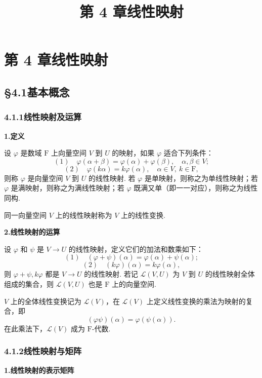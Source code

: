 \documentclass[UTF8, 12pt, fontset=fandol, oneside]{ctexart}
\title{第 4 章\quad 线性映射}
\author{}
\date{}
\begin{document}
\maketitle

\section*{第 4 章\quad 线性映射}

\subsection*{§4.1\quad 基本概念}

\subsubsection*{4.1.1\quad 线性映射及运算}

\noindent\textbf{1.\quad 定义}

设 $\varphi$ 是数域 $\mathrm{F}$ 上向量空间 $V$ 到 $U$ 的映射，如果 $\varphi$ 适合下列条件：
\[
(1)\quad \varphi(\alpha+\beta)=\varphi(\alpha)+\varphi(\beta),\quad \alpha,\beta\in V;
\]
\[
(2)\quad \varphi(k\alpha)=k\varphi(\alpha),\quad \alpha\in V,\ k\in \mathrm{F},
\]
则称 $\varphi$ 是向量空间 $V$ 到 $U$ 的线性映射. 若 $\varphi$ 是单映射，则称之为单线性映射；若 $\varphi$ 是满映射，则称之为满线性映射；若 $\varphi$ 既满又单（即一一对应），则称之为线性同构.

同一向量空间 $V$ 上的线性映射称为 $V$ 上的线性变换.

\noindent\textbf{2.\quad 线性映射的运算}

设 $\varphi$ 和 $\psi$ 是 $V\to U$ 的线性映射，定义它们的加法和数乘如下：
\[
(1)\quad (\varphi+\psi)(\alpha)=\varphi(\alpha)+\psi(\alpha);
\]
\[
(2)\quad (k\varphi)(\alpha)=k\varphi(\alpha),
\]
则 $\varphi+\psi,k\varphi$ 都是 $V\to U$ 的线性映射. 若记 $\mathcal{L}(V,U)$ 为 $V$ 到 $U$ 的线性映射全体组成的集合，则 $\mathcal{L}(V,U)$ 也是 $\mathrm{F}$ 上的向量空间.

$V$ 上的全体线性变换记为 $\mathcal{L}(V)$，在 $\mathcal{L}(V)$ 上定义线性变换的乘法为映射的复合，即
\[
(\varphi\psi)(\alpha)=\varphi(\psi(\alpha)).
\]
在此乘法下，$\mathcal{L}(V)$ 成为 $\mathrm{F}$-代数.

\subsubsection*{4.1.2\quad 线性映射与矩阵}

\noindent\textbf{1.\quad 线性映射的表示矩阵}
\end{document}
